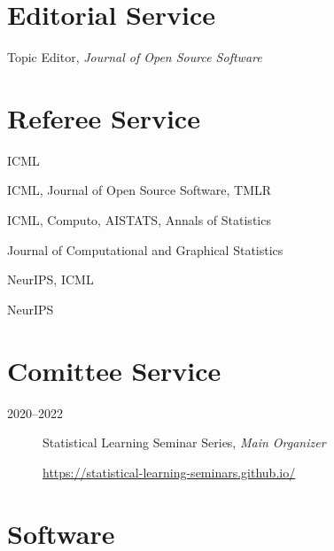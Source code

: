 \documentclass[
  a4paper,
]{article}
\providecommand{\tightlist}{%
  \setlength{\itemsep}{0pt}\setlength{\parskip}{0pt}}
\begin{document}
\section{Editorial Service}\label{editorial-service}

\begin{description}
\tightlist
\item[2025--present]
Topic Editor, \emph{Journal of Open Source Software}
\end{description}

\section{Referee Service}\label{referee-service}

\begin{description}
\tightlist
\item[2026]
ICML
\item[2025]
ICML, Journal of Open Source Software, TMLR
\item[2024]
ICML, Computo, AISTATS, Annals of Statistics
\item[2023]
Journal of Computational and Graphical Statistics
\item[2022]
NeurIPS, ICML
\item[2021]
NeurIPS
\end{description}

\section{Comittee Service}\label{comittee-service}

\begin{description}
\item[2020--2022]
Statistical Learning Seminar Series, \emph{Main Organizer}

\url{https://statistical-learning-seminars.github.io/}
\end{description}

\section{Software}\label{software}
\end{document}
